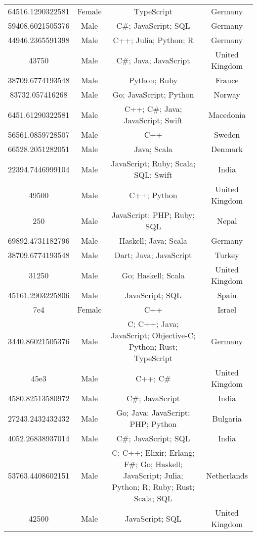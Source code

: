 \begin{center}
\begin{tabular}{ |c|c|c|c| }
64516.1290322581  &  Female  &  TypeScript  &  Germany  \\ 
59408.6021505376  &  Male  &  C\#; JavaScript; SQL  &  Germany  \\ 
44946.2365591398  &  Male  &  C++; Julia; Python; R  &  Germany  \\ 
43750  &  Male  &  C\#; Java; JavaScript  &  United Kingdom  \\ 
38709.6774193548  &  Male  &  Python; Ruby  &  France  \\ 
83732.057416268  &  Male  &  Go; JavaScript; Python  &  Norway  \\ 
6451.61290322581  &  Male  &  C++; C\#; Java; JavaScript; Swift  &  Macedonia  \\ 
56561.0859728507  &  Male  &  C++  &  Sweden  \\ 
66528.2051282051  &  Male  &  Java; Scala  &  Denmark  \\ 
22394.7446999104  &  Male  &  JavaScript; Ruby; Scala; SQL; Swift  &  India  \\ 
49500  &  Male  &  C++; Python  &  United Kingdom  \\ 
250  &  Male  &  JavaScript; PHP; Ruby; SQL  &  Nepal  \\ 
69892.4731182796  &  Male  &  Haskell; Java; Scala  &  Germany  \\ 
38709.6774193548  &  Male  &  Dart; Java; JavaScript  &  Turkey  \\ 
31250  &  Male  &  Go; Haskell; Scala  &  United Kingdom  \\ 
45161.2903225806  &  Male  &  JavaScript; SQL  &  Spain  \\ 
7e4  &  Female  &  C++  &  Israel  \\ 
3440.86021505376  &  Male  &  C; C++; Java; JavaScript; Objective-C; Python; Rust; TypeScript  &  Germany  \\ 
45e3  &  Male  &  C++; C\#  &  United Kingdom  \\ 
4580.82513580972  &  Male  &  C\#; JavaScript  &  India  \\ 
27243.2432432432  &  Male  &  Go; Java; JavaScript; PHP; Python  &  Bulgaria  \\ 
4052.26838937014  &  Male  &  C\#; JavaScript; SQL  &  India  \\ 
53763.4408602151  &  Male  &  C; C++; Elixir; Erlang; F\#; Go; Haskell; JavaScript; Julia; Python; R; Ruby; Rust; Scala; SQL  &  Netherlands  \\ 
42500  &  Male  &  JavaScript; SQL  &  United Kingdom  \\ 

\end{tabular}
\end{center}
